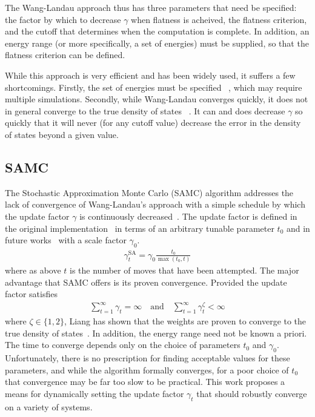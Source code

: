 \documentclass[letterpaper,twocolumn,amsmath,amssymb,pre,aps,10pt]{revtex4-1}
\begin{document}
The Wang-Landau approach thus has three parameters that need be
specified: the factor by which to decrease $\gamma$ when flatness is
acheived, the flatness criterion, and the cutoff that determines when
the computation is complete.  In addition, an energy range (or more
specifically, a set of energies) must be supplied, so that the
flatness criterion can be defined.

While this approach
is very efficient and has been widely used, it suffers a few
shortcomings.  Firstly, the set of energies must be specified
~\cite{wang2001efficient, schulz2003avoiding, yan2003fast}, which may 
require multiple simulations. Secondly, while Wang-Landau converges quickly, 
it does not in general converge to the true density of states
~\cite{belardinelli2008analysis, zhou2008optimal}.  It can and does decrease
$\gamma$ so quickly that it will never (for any cutoff value) decrease the 
error in the density of states beyond a given value.

\subsection{SAMC}
The Stochastic Approximation Monte Carlo (SAMC) algorithm addresses
the lack of convergence of Wang-Landau's approach with a simple
schedule by which the update factor $\gamma$ is continuously
decreased~\cite{liang2007stochastic, werlich2015stochastic,
  schneider2017convergence}.  The update factor is defined in the
original implementation~\cite{liang2007stochastic} in terms of an
arbitrary tunable parameter $t_0$ and in future works~\cite{werlich2015stochastic} with a scale factor
$\gamma_0$.
\begin{align}
\gamma_{t}^{\text{SA}} =\gamma_0 \frac{t_0}{\max(t_0,t)}
\end{align}
where as above $t$ is the number of moves that have been attempted.
The major advantage that SAMC offers is its proven convergence.
Provided the update factor satisfies
\begin{align}
\sum_{t=1}^\infty \gamma_{t} = \infty \quad\textrm{and}\quad
\sum_{t=1}^\infty \gamma_{t}^\zeta < \infty
\end{align}
where $\zeta \in \{1,2\}$, Liang has shown that the weights are proven
to converge to the true density of states~\cite{liang2006theory,
  liang2007stochastic}.  In addition, the energy range need not be
known a priori.  The time to converge depends only on the choice of
parameters $t_0$ and $\gamma_0$.  Unfortunately, there is no
prescription for finding acceptable values for these parameters, and
while the algorithm formally converges, for a poor choice of $t_0$
that convergence may be far too slow to be practical.  This work
proposes a means for dynamically setting the update factor $\gamma_t$
that should robustly converge on a variety of systems.
\end{document}
